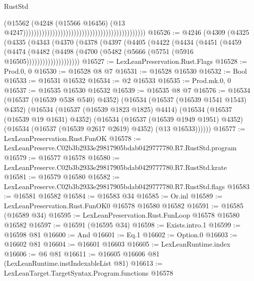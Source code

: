 \begin{lexlean}{RustStd}
\begin{coremodule}
                                                                                          (@15562
                                                                                            (@4248
                                                                                              (@15566
                                                                                                @16456)
                                                                                              (@13
                                                                                                @4247))))))))))))))))))))))))))))))))))))))))))))))
@16526 := @4246
    (@4309
      (@4325
        (@4335
          (@4343
            (@4370
              (@4378
                (@4397
                  (@4405
                    (@4422
                      (@4434
                        (@4451
                          (@4459
                            (@4474
                              (@4482
                                (@4498 (@4700 (@5482 (@5666 (@5751 (@5916 @16505))))))))))))))))))))
@16527 := LexLeanPreservation.Rust.Flags
@16528 := Prod.{0, 0}
@16530 := @16528 @8 @7
@16531 := @16528 @16530
@16532 := Bool
@16533 := @16531 @16532
@16534 := @2 @16533
@16535 := Prod.mk.{0, 0}
@16537 := @16535 @16530 @16532
@16539 := @16535 @8 @7
@16576 := @16534
    (@16537 (@16539 @538 @540) @4352)
    (@16534
      (@16537 (@16539 @1541 @1543) @4352)
      (@16534
        (@16537 (@16539 @1823 @1825) @4414)
        (@16534
          (@16537 (@16539 @19 @1631) @4352)
          (@16534
            (@16537 (@16539 @1949 @1951) @4352)
            (@16534 (@16537 (@16539 @2617 @2619) @4352) (@13 @16533))))))
@16577 := LexLeanPreservation.Rust.FunOK
@16578 := LexLeanPreserve.C02b3b2933e29817905bdab0429777780.R7.RustStd.program
@16579 := @16577 @16578
@16580 := LexLeanPreserve.C02b3b2933e29817905bdab0429777780.R7.RustStd.krate
@16581 := @16579 @16580
@16582 := LexLeanPreserve.C02b3b2933e29817905bdab0429777780.R7.RustStd.flags
@16583 := @16581 @16582
@16584 := @16583 @34
@16585 := Or.inl
@16589 := LexLeanPreservation.Rust.FunOK0 @16578 @16580 @16582
@16591 := @16585 (@16589 @34)
@16595 := LexLeanPreservation.Rust.FunLoop @16578 @16580 @16582
@16597 := @16591 (@16595 @34)
@16598 := Exists.intro.{1}
@16599 := @16598 @81
@16600 := And
@16601 := Eq.{1}
@16602 := Option.{0}
@16603 := @16602 @81
@16604 := @16601 @16603
@16605 := LexLeanRuntime.index
@16606 := @6 @81
@16611 := @16605 @16606 @81 (LexLeanRuntime.instIndexableList @81)
@16613 := LexLeanTarget.TargetSyntax.Program.functions @16578

\end{coremodule}
\end{lexlean}
